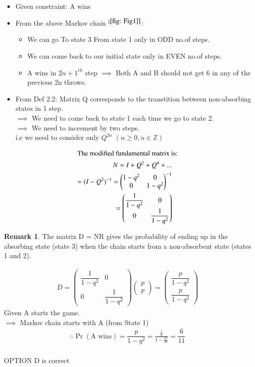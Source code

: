 \documentclass[journal,12pt,twocolumn]{IEEEtran}
\theoremstyle{definition}
\newtheorem*{remark}{Remark}
\providecommand{\pr}[1]{\ensuremath{\Pr\left(#1\right)}}
\newcommand{\myvec}[1]{\ensuremath{\begin{pmatrix}#1\end{pmatrix}}}
\begin{document}
\begin{itemize}
    \item  Given constraint: A wins\\
    \item From the above Markov chain $^{[\ref{fig: Fig1]}}$:\\
    \begin{itemize}
        \item We can go To state 3 From state 1 only in ODD no.of steps.
        \item We can come back to our initial state only in EVEN no.of steps.
        \item A wins in ${2n+1}^{th}$ step $\implies$ Both A and B should not get 6 in any of the previous 2n throws.
    \end{itemize}
    \item From Def 2.2: Matrix Q corresponds to the transtition between non-absorbing states in 1 step.\\
    $\implies$ We need to come back to state 1 each time we go to state 2.\\
    $\implies$ We need to increment by two steps.\\
    i.e we need to consider only $Q^{2n}$ $(n \ge 0, n \in \mathbb{Z}) $\\
\end{itemize}
\begin{align}
\intertext{The modified fundamental matrix is:}
    N = I + Q^2 + Q^4 + ...\\
    = (I - Q^2)^{-1} = \myvec{1 - q^2 & 0\\ 0 & 1 - q^2}^{-1} \\ 
    =\myvec{\dfrac{1}{1 - q^2} & 0\\ 0 & \dfrac{1}{1 - q^2}}
\end{align}
\begin{remark}
    \item The matrix D = NR gives the probability of ending up in the absorbing state (state 3) when the chain starts from a non-absorbent state (states 1 and 2).
\end{remark}
\begin{align}
    D = \myvec{\dfrac{1}{1 - q^2} & 0\\ 0 & \dfrac{1}{1 - q^2}} \myvec{p\\p} = \myvec{\dfrac{p}{1 - q^2}\\ \dfrac{p}{1 - q^2}}
\end{align}
Given A starts the game.\\
$\implies$ Markov chain starts with A (from State 1)
\large
\begin{align}
    \therefore \pr{\text{A wins}} = \dfrac{p}{1 - q^2}= \frac{\frac{1}{6}}{1 - \frac{25}{36}} = \dfrac{6}{11}
\end{align}\\[7pt]
        \centering
OPTION D is correct
\end{document}
